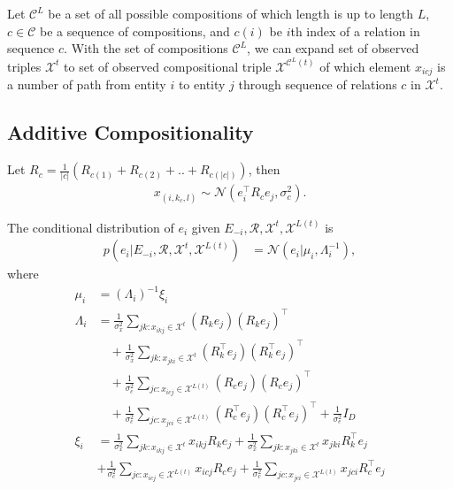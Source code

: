 \documentclass{article}
\begin{document}
Let $\mathcal{C}^{L}$ be a set of all possible compositions of which length is up to length $L$, $c \in \mathcal{C}$ be a sequence of compositions, and $c(i)$ be $i$th index of a relation in sequence $c$. With the set of compositions $\mathcal{C}^{L}$, we can expand set of observed triples $\mathcal{X}^{t}$ to set of observed compositional triple $\mathcal{X}^{\mathcal{C}^{L}(t)}$ of which element $x_{icj}$ is a number of path from entity $i$ to entity $j$ through sequence of relations $c$ in $\mathcal{X}^{t}$.

\subsection{Additive Compositionality}
Let $R_{{c}} = \frac{1}{|c|}(R_{c(1)} + R_{c(2)} + .. + R_{c(|c|)})$, then
\begin{align}
x_{(i, k_{{c}}, l)} \sim \mathcal{N}(e_i^\top R_c e_j, \sigma_{c}^2).
\end{align}

The conditional distribution of $e_i$ given $E_{-i}, \mathcal{R}, \mathcal{X}^{t}, \mathcal{X}^{L(t)}$ is 
\begin{align} \label{eqn:sample_e}
p(e_i |E_{-i}, \mathcal{R}, \mathcal{X}^{t}, \mathcal{X}^{L(t)}) &= \mathcal{N}(e_i | \mu_i, \Lambda_i^{-1}),
\end{align}
where
\begin{align*}
\mu_i &= (\Lambda_i)^{-1}\xi_i \\
\Lambda_i &= \frac{1}{\sigma_x^2} \sum_{jk : x_{ikj} \in \mathcal{X}^{t}} (R_k e_j)(R_k e_j)^\top \\
&\quad+ \frac{1}{\sigma_x^2} \sum_{jk : x_{jki} \in \mathcal{X}^{t}} (R_k^\top e_j)(R_k^\top e_j)^\top \\
&\quad + \frac{1}{\sigma_c^2} \sum_{jc : x_{icj} \in \mathcal{X}^{L(t)}} (R_c e_j)(R_c e_j)^\top \\
&\quad+ \frac{1}{\sigma_c^2} \sum_{jc : x_{jci} \in \mathcal{X}^{L(t)}} (R_c^\top e_j)(R_c^\top e_j)^\top + \frac{1}{\sigma_e^2} {I}_D \\
\xi_i &= \frac{1}{\sigma_x^2}\sum_{jk : x_{ikj} \in \mathcal{X}^{t}}  x_{ikj} R_{k} e_{j} + \frac{1}{\sigma_x^2}\sum_{jk : x_{jki} \in \mathcal{X}^{t}} x_{jki} R_{k}^\top e_{j} \\
& + \frac{1}{\sigma_c^2}\sum_{jc : x_{icj} \in \mathcal{X}^{L(t)}}  x_{icj} R_{c} e_{j} + \frac{1}{\sigma_c^2}\sum_{jc : x_{jci} \in \mathcal{X}^{L(t)}} x_{jci} R_{c}^\top e_{j}
\end{align*}
\end{document}
